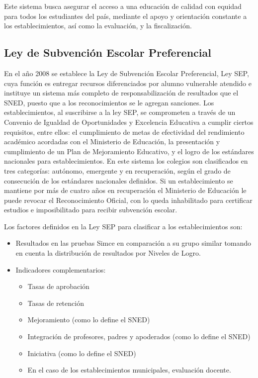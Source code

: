 Este sistema busca asegurar el acceso a una educación de calidad con equidad para todos los estudiantes del país, mediante el apoyo y orientación constante a los establecimientos, así como la evaluación, y la fiscalización. \cite{sac}

\subsection{Ley de Subvención Escolar Preferencial}
En el año 2008 se establece la Ley de Subvención Escolar Preferencial, Ley SEP, cuya función es entregar recursos diferenciados por alumno vulnerable atendido e instituye un sistema más completo de responsabilización de resultados que el SNED, puesto que a los reconocimientos se le agregan sanciones. Los establecimientos, al suscribirse a la ley SEP, se comprometen a través de un Convenio de Igualdad de Oportunidades y Excelencia Educativa a cumplir ciertos requisitos, entre ellos: el cumplimiento de metas de efectividad del rendimiento académico acordadas con el Ministerio de Educación, la presentación y cumplimiento de un Plan de Mejoramiento Educativo, y el logro de los estándares nacionales para establecimientos. En este sistema los colegios son clasificados en tres categorías: autónomo, emergente y en recuperación, según el grado de consecución de los estándares nacionales definidos. Si un establecimiento se mantiene por más de cuatro años en recuperación el Ministerio de Educación le puede revocar el Reconocimiento Oficial, con lo queda inhabilitado para certificar estudios e imposibilitado para recibir subvención escolar.

Los factores definidos en la Ley SEP para clasificar a los establecimientos son:
\begin{itemize}
\item Resultados en las pruebas Simce en comparación a su grupo similar tomando en cuenta la distribución de resultados por Niveles de Logro.
\item Indicadores complementarios:
    \begin{itemize}
    \item Tasas de aprobación
    \item Tasas de retención
    \item Mejoramiento (como lo define el SNED)
    \item Integración de profesores, padres y apoderados (como lo define el SNED)
    \item Iniciativa (como lo define el SNED)
    \item En el caso de los establecimientos municipales, evaluación docente.
    \end{itemize}
\end{itemize}

